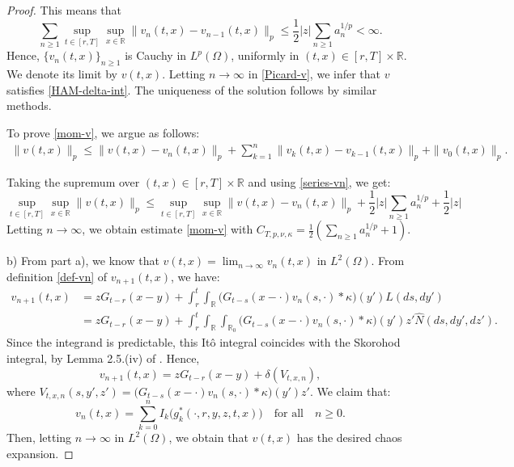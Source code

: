\documentclass[12pt]{article}
\def\bR{\mathbb{R}}
\def\k{\kappa}
\begin{document}
\begin{proof}
This means that
\begin{equation}
\label{series-vn}
\sum_{n\geq 1}\sup_{t \in [r,T]}\sup_{x\in \bR} \|v_n(t,x)-v_{n-1}(t,x)\|_{p} \leq \frac{1}{2} |z|\sum_{n \geq 1} a_n^{1/p}<\infty.
\end{equation}
Hence, $\{v_n(t,x)\}_{n\geq 1}$ is Cauchy in $L^p(\Omega)$, uniformly in $(t,x)\in [r,T] \times \bR$. We denote its limit by $v(t,x)$. Letting $n \to \infty$ in \eqref{Picard-v}, we infer that $v$ satisfies \eqref{HAM-delta-int}. The uniqueness of the solution follows by similar methods.

To prove \eqref{mom-v}, we argue as follows:
\begin{align*}
\|v(t,x)\|_p \leq \|v(t,x)-v_n(t,x)\|_p +\sum_{k=1}^{n}\|v_k(t,x)-v_{k-1}(t,x)\|_p+\|v_0(t,x)\|_p.
\end{align*}

Taking the supremum over 
$(t,x) \in [r,T] \times \bR$ and using \eqref{series-vn}, we get:
\[
\sup_{t \in [r,T]}\sup_{x\in \bR} \|v(t,x)\|_p  \leq \sup_{t \in [r,T]}\sup_{x\in \bR}\|v(t,x)-v_n(t,x)\|_p +\frac{1}{2}|z|\sum_{n\geq 1}a_n^{1/p}+\frac{1}{2}|z|
\]
Letting $n \to \infty$, we obtain estimate \eqref{mom-v} with $C_{T,p,\nu,\k}=\frac{1}{2}(\sum_{n\geq 1}a_n^{1/p}+1)$.

b) From part a), we know that $v(t,x)=\lim_{n \to \infty}v_n(t,x)$ in $L^2(\Omega)$. From  definition \eqref{def-vn} of $v_{n+1}(t,x)$, we have:
\begin{align*}
v_{n+1}(t,x)&=zG_{t-r}(x-y)+\int_r^t \int_{\bR} \big(G_{t-s}(x-\cdot) v_n(s,\cdot) * \k\big)(y') L(ds,dy')\\
&=zG_{t-r}(x-y)+\int_r^t \int_{\bR} \int_{\bR_0}\big(G_{t-s}(x-\cdot) v_n(s,\cdot) * \k\big)(y') z'\widehat{N}(ds,dy',dz').
\end{align*}
Since the integrand is predictable, this It\^o integral coincides with the Skorohod integral, by Lemma 2.5.(iv) of \cite{BZ24}. Hence,
\[
v_{n+1}(t,x)=zG_{t-r}(x-y)+\delta(V_{t,x,n}),
\]
where $V_{t,x,n}(s,y',z')=\big(G_{t-s}(x-\cdot) v_n(s,\cdot) * \k\big)(y') z'$. 
We claim that:
\begin{equation}
\label{claim1}
v_{n}(t,x)=\sum_{k=0}^n I_{k}\big(g_k^*(\cdot,r,y,z,t,x)\big) \quad \mbox{for all} \quad n\geq 0.
\end{equation}
Then, letting $n\to \infty$ in $L^2(\Omega)$, we obtain that $v(t,x)$ has the desired chaos expansion.


\end{proof}
\end{document}
